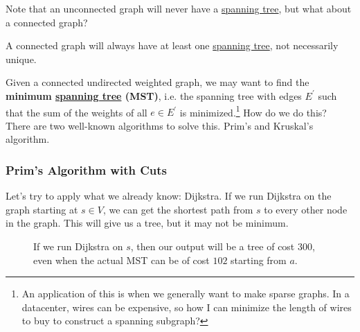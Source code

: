   Note that an unconnected graph will never have a \hyperref[def:spanning-tree]{spanning tree}, but what about a connected graph? 

  \begin{theorem}
    \label{thm:spanning-trees-of-connected-graphs}
    A connected graph will always have at least one \hyperref[def:spanning-tree]{spanning tree}, not necessarily unique. 
  \end{theorem}

  Given a connected undirected weighted graph, we may want to find the \textbf{minimum \hyperref[def:spanning-tree]{spanning tree} (MST)}, i.e. the spanning tree with edges $E^\prime$ such that the sum of the weights of all $e \in E^\prime$ is minimized.\footnote{An application of this is when we generally want to make sparse graphs. In a datacenter, wires can be expensive, so how I can minimize the length of wires to buy to construct a spanning subgraph?} How do we do this? There are two well-known algorithms to solve this. Prim's and Kruskal's algorithm.  

\subsubsection{Prim's Algorithm with Cuts}

  Let's try to apply what we already know: Dijkstra. If we run Dijkstra on the graph starting at $s \in V$, we can get the shortest path from $s$ to every other node in the graph. This will give us a tree, but it may not be minimum. 

  \begin{figure}[H]
    \centering 
    \caption{If we run Dijkstra on $s$, then our output will be a tree of cost $300$, even when the actual MST can be of cost $102$ starting from $a$.} 
    \label{fig:dik_mst_prob}
  \end{figure}

